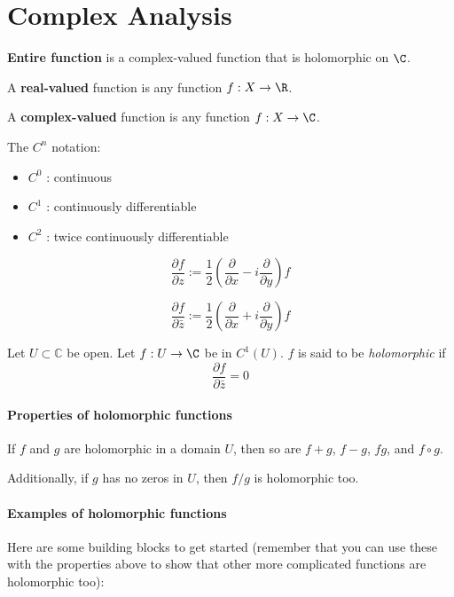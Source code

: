 
\section{Complex Analysis}\label{f28d4dc}


\textbf{Entire function} is a complex-valued function that is holomorphic on $\C$.

A \textbf{real-valued} function is any function $f:X\to\R$.

A \textbf{complex-valued} function is any function $f:X\to\C$.

The $C^n$ notation:
\begin{itemize}
	\item $C^0$ : continuous
	\item $C^1$ : continuously differentiable
	\item $C^2$ : twice continuously differentiable
\end{itemize}

\label{ffea0ed}

$$
	\frac{\partial f}{\partial z} :=
	\frac12\left(
	\frac{\partial}{\partial x}-i\frac{\partial}{\partial y}
	\right)f
$$

$$
	\frac{\partial f}{\partial\bar z} :=
	\frac12\left(
	\frac{\partial}{\partial x}+i\frac{\partial}{\partial y}
	\right)f
$$

\label{e1e08f7}

Let $U\subset\mathbb C$ be open. Let $f:U\to\C$ be in $C^1(U)$. $f$ is
said to be \textit{holomorphic} if
$$
	\frac{\partial f}{\partial\bar z}=0
$$

\paragraph{Properties of holomorphic functions} If $f$ and $g$ are
holomorphic in a domain $U$, then so are $f+g$, $f-g$, $fg$, and
$f\circ g$.

Additionally, if $g$ has no zeros in $U$, then $f/g$ is holomorphic
too.

\paragraph{Examples of holomorphic functions}

Here are some building blocks to get started (remember that you can
use these with the properties above to show that other more
complicated functions are holomorphic too):

